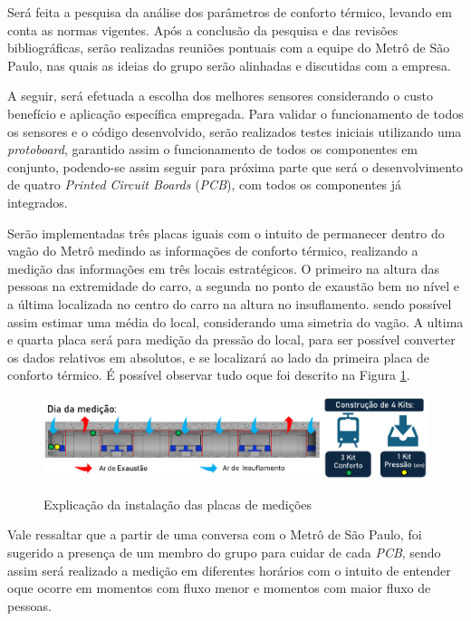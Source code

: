 \documentclass[acronym,symbols,table]{fei}
\begin{document}
Será feita a pesquisa da análise dos parâmetros de conforto térmico, levando em conta as normas vigentes. Após a conclusão da pesquisa e das revisões bibliográficas, serão realizadas reuniões pontuais com a equipe do Metrô de São Paulo, nas quais as ideias do grupo serão alinhadas e discutidas com a empresa. 

A seguir, será efetuada a escolha dos melhores sensores considerando o custo benefício e aplicação específica empregada. Para validar o funcionamento de todos os sensores e o código desenvolvido, serão realizados testes iniciais utilizando uma \textit{protoboard}, garantido assim o funcionamento de todos os componentes em conjunto, podendo-se assim seguir para próxima parte que será o desenvolvimento de quatro \textit{Printed Circuit Boards} (\textit{PCB}), com todos os componentes já integrados. 

Serão implementadas três placas iguais com o intuito de permanecer dentro do vagão do Metrô medindo as informações de conforto térmico, realizando a medição das informações em três locais estratégicos. O primeiro na altura das pessoas na extremidade do carro, a segunda no ponto de exaustão bem no nível e a última localizada no centro do carro na altura no insuflamento. sendo possível assim estimar uma média do local, considerando uma simetria do vagão. A ultima e quarta placa será para medição da pressão do local, para ser possível converter os dados relativos em absolutos, e se localizará ao lado da primeira placa de conforto térmico. É possível observar tudo oque foi descrito na Figura \ref{fig:metodo_de_medicao}.

\begin{figure}[!htb]
 \centering
    \caption{Explicação da instalação das placas de medições}
    \includegraphics[width=1\linewidth]{Imagens/metodo_de_medicao.png}
    \label{fig:metodo_de_medicao}
\end{figure}


Vale ressaltar que a partir de uma conversa com o Metrô de São Paulo, foi sugerido a presença de um membro do grupo para cuidar de cada \textit{PCB}, sendo assim será realizado a medição em diferentes horários com o intuito de entender oque ocorre em momentos com fluxo menor e momentos com maior fluxo de pessoas.
\end{document}
